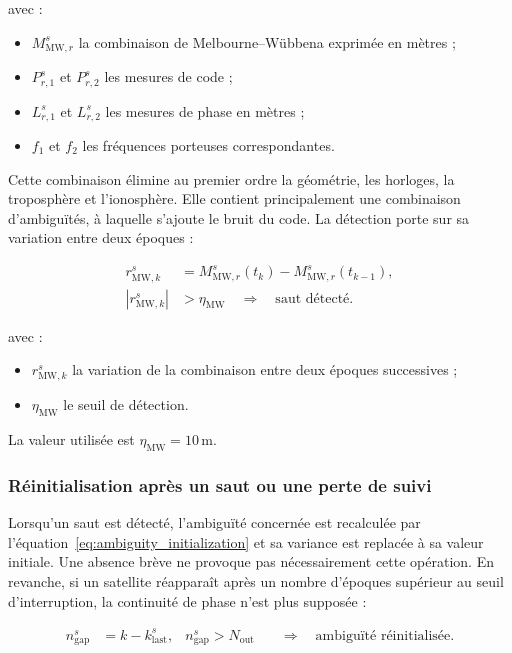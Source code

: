 avec :

\begin{itemize}
    \item $M_{\mathrm{MW},r}^s$ la combinaison de Melbourne--Wübbena exprimée
    en mètres ;
    \item $P_{r,1}^s$ et $P_{r,2}^s$ les mesures de code ;
    \item $L_{r,1}^s$ et $L_{r,2}^s$ les mesures de phase en mètres ;
    \item $f_1$ et $f_2$ les fréquences porteuses correspondantes.
\end{itemize}

Cette combinaison élimine au premier ordre la géométrie, les horloges, la
troposphère et l'ionosphère. Elle contient principalement une combinaison
d'ambiguïtés, à laquelle s'ajoute le bruit du code. La détection porte sur sa
variation entre deux époques :

\begin{align}
r_{\mathrm{MW},k}^s
&=
M_{\mathrm{MW},r}^s(t_k)-M_{\mathrm{MW},r}^s(t_{k-1}),
\\
\left|r_{\mathrm{MW},k}^s\right|
&>\eta_{\mathrm{MW}}
\quad\Longrightarrow\quad
\text{saut détecté}.
\label{eq:melbourne_wubbena_detection}
\end{align}

avec :

\begin{itemize}
    \item $r_{\mathrm{MW},k}^s$ la variation de la combinaison entre deux
    époques successives ;
    \item $\eta_{\mathrm{MW}}$ le seuil de détection.
\end{itemize}

La valeur utilisée est $\eta_{\mathrm{MW}}=10\,\mathrm{m}$.

\subsubsection{Réinitialisation après un saut ou une perte de suivi}

Lorsqu'un saut est détecté, l'ambiguïté concernée est recalculée par
l'équation~\eqref{eq:ambiguity_initialization} et sa variance est replacée à sa
valeur initiale. Une absence brève ne provoque pas nécessairement cette
opération. En revanche, si un satellite réapparaît après un nombre d'époques
supérieur au seuil d'interruption, la continuité de phase n'est plus supposée :

\begin{align}
n_{\mathrm{gap}}^s
&=
k-k_{\mathrm{last}}^s,
&
n_{\mathrm{gap}}^s>N_{\mathrm{out}}
&\quad\Longrightarrow\quad
\text{ambiguïté réinitialisée}.
\label{eq:outage_reset}
\end{align}

